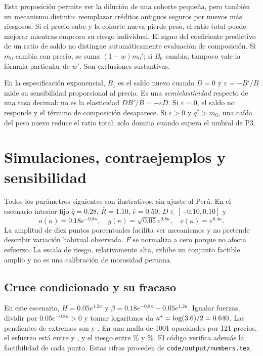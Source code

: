 \documentclass[11pt]{article}
\theoremstyle{definition}\newtheorem{assumption}{Supuesto}
\begin{document}
Esta proposición permite ver la dilución de una cohorte pequeña, pero también
un mecanismo distinto: reemplazar créditos antiguos seguros por nuevos más
riesgosos. Si el precio sube y la cohorte nueva pierde peso, el ratio total
puede mejorar mientras empeora su riesgo individual. El signo del coeficiente
predictivo de un ratio de saldo no distingue automáticamente evaluación de
composición. Si $m_0$ cambia con precio, se suma $(1-w)m_0'$; si $B_0$ cambia,
tampoco vale la fórmula particular de $w'$. Son exclusiones sustantivas.

En la especificación exponencial, $B_1$ es el saldo nuevo cuando $D=0$ y
$\varepsilon=-B'/B$ mide su sensibilidad proporcional al precio. Es una
\emph{semielasticidad} respecto de una tasa decimal: no es la elasticidad
$DB'/B=-\varepsilon D$. Si $\varepsilon=0$, el saldo no responde y el término
de composición desaparece. Si $\varepsilon>0$ y $q^*>m_0$, una caída del peso
nuevo reduce el ratio total; solo domina cuando supera el umbral de P3.

\section{Simulaciones, contraejemplos y sensibilidad}\label{sec:sim}
Todos los parámetros siguientes son ilustrativos, sin ajuste al Perú.
En el escenario interior fijo $\bar q=0.28$, $\bar R=1.10$,
$\bar e=0.50$, $D\in[-0.10,0.10]$ y
\[
a(\kappa)=0.18e^{-0.8\kappa},\quad
g(\kappa)=\sqrt{0.05}e^{0.8\kappa},\quad c(\kappa)=e^{0.4\kappa}.
\]
La amplitud de diez puntos porcentuales facilita ver mecanismos y no pretende
describir variación habitual observada. $F$ se normaliza a cero porque no
afecta esfuerzo. La escala de riesgo, relativamente alta, exhibe un conjunto
factible amplio y no es una calibración de morosidad peruana.

\subsection{Cruce condicionado y su fracaso}
En este escenario, $H=0.05e^{1.2\kappa}$ y $\beta=0.18e^{-0.8\kappa}-0.05e^{1.2\kappa}$.
Igualar fuerzas, dividir por $0.05e^{-0.8\kappa}>0$ y tomar logaritmos da
$\kappa^*=\log(3.6)/2=0.640$. Las pendientes de extremos son
\betaZero{} y \betaOne{}. En una malla de 1001 opacidades por 121 precios,
el esfuerzo está entre \effortMin{} y \effortMax{}, y el riesgo entre
\riskMin\% y \riskMax\%. El código verifica además la factibilidad de
cada punto. Estas cifras proceden de \texttt{code/output/numbers.tex}.
\end{document}
